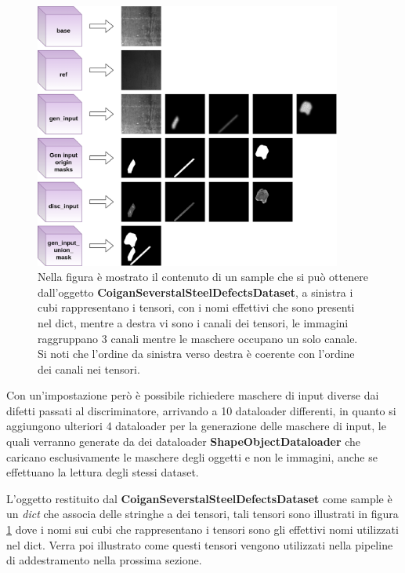 \begin{figure}[H]
    \centering
    \includegraphics[width=0.9\textwidth]{imgs/Coigan/Output_coigan_dataloader.png}
    \caption{Nella figura è mostrato il contenuto di un sample che si può ottenere dall'oggetto \textbf{CoiganSeverstalSteelDefectsDataset},
    a sinistra i cubi rappresentano i tensori, con i nomi effettivi che sono presenti nel dict, mentre a destra vi sono i canali dei tensori,
    le immagini raggruppano 3 canali mentre le maschere occupano un solo canale. Si noti che l'ordine da sinistra verso destra è coerente
    con l'ordine dei canali nei tensori.}
    \label{fig:coigan_severstal_steel_defects_dataset_sample}
\end{figure}

Con un'impostazione però è possibile richiedere maschere di input diverse dai difetti passati al discriminatore, arrivando a 10 dataloader differenti, in quanto
si aggiungono ulteriori 4 dataloader per la generazione delle maschere di input, le quali verranno generate da dei dataloader \textbf{ShapeObjectDataloader} che caricano
esclusivamente le maschere degli oggetti e non le immagini, anche se effettuano la lettura degli stessi dataset.

L'oggetto restituito dal \textbf{CoiganSeverstalSteelDefectsDataset} come sample è un \textit{dict} che associa delle stringhe a dei tensori, tali tensori sono illustrati in
figura \ref{fig:coigan_severstal_steel_defects_dataset_sample} dove i nomi sui cubi che rappresentano i tensori sono gli effettivi nomi utilizzati nel dict.
Verra poi illustrato come questi tensori vengono utilizzati nella pipeline di addestramento nella prossima sezione.

